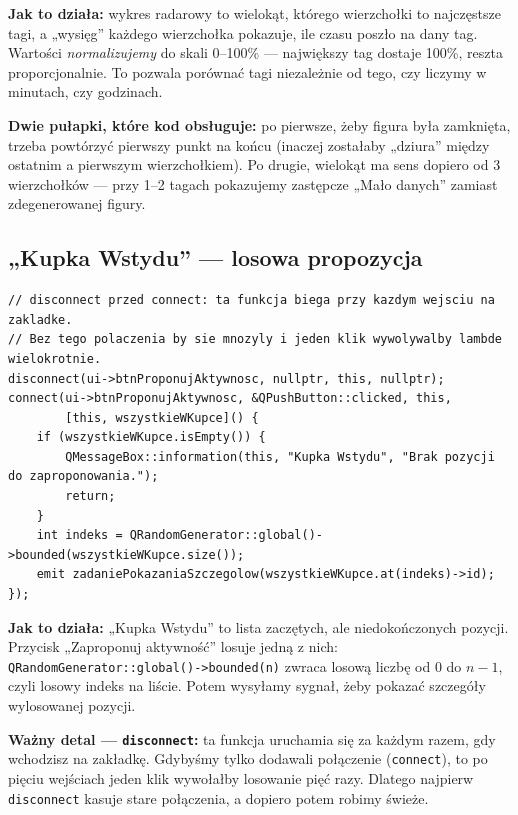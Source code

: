 \documentclass[11pt,a4paper]{article}
\begin{document}
\textbf{Jak to działa:} wykres radarowy to wielokąt, którego wierzchołki to
najczęstsze tagi, a „wysięg” każdego wierzchołka pokazuje, ile czasu poszło na
dany tag. Wartości \emph{normalizujemy} do skali 0--100\% --- największy tag dostaje
100\%, reszta proporcjonalnie. To pozwala porównać tagi niezależnie od tego, czy
liczymy w minutach, czy godzinach.

\textbf{Dwie pułapki, które kod obsługuje:} po pierwsze, żeby figura była zamknięta,
trzeba powtórzyć pierwszy punkt na końcu (inaczej zostałaby „dziura” między
ostatnim a pierwszym wierzchołkiem). Po drugie, wielokąt ma sens dopiero od 3
wierzchołków --- przy 1--2 tagach pokazujemy zastępcze „Mało danych” zamiast
zdegenerowanej figury.

\subsection{„Kupka Wstydu” --- losowa propozycja}

\begin{lstlisting}[caption={Losowanie pozycji do nadrobienia}]
// disconnect przed connect: ta funkcja biega przy kazdym wejsciu na zakladke.
// Bez tego polaczenia by sie mnozyly i jeden klik wywolywalby lambde wielokrotnie.
disconnect(ui->btnProponujAktywnosc, nullptr, this, nullptr);
connect(ui->btnProponujAktywnosc, &QPushButton::clicked, this,
        [this, wszystkieWKupce]() {
    if (wszystkieWKupce.isEmpty()) {
        QMessageBox::information(this, "Kupka Wstydu", "Brak pozycji do zaproponowania.");
        return;
    }
    int indeks = QRandomGenerator::global()->bounded(wszystkieWKupce.size());
    emit zadaniePokazaniaSzczegolow(wszystkieWKupce.at(indeks)->id);
});
\end{lstlisting}

\textbf{Jak to działa:} „Kupka Wstydu” to lista zaczętych, ale niedokończonych
pozycji. Przycisk „Zaproponuj aktywność” losuje jedną z nich:
\texttt{QRandomGenerator::global()->bounded(n)} zwraca losową liczbę od 0 do
$n-1$, czyli losowy indeks na liście. Potem wysyłamy sygnał, żeby pokazać
szczegóły wylosowanej pozycji.

\textbf{Ważny detal --- \texttt{disconnect}:} ta funkcja uruchamia się za każdym
razem, gdy wchodzisz na zakładkę. Gdybyśmy tylko dodawali połączenie
(\texttt{connect}), to po pięciu wejściach jeden klik wywołałby losowanie pięć
razy. Dlatego najpierw \texttt{disconnect} kasuje stare połączenia, a dopiero
potem robimy świeże.

\end{document}
